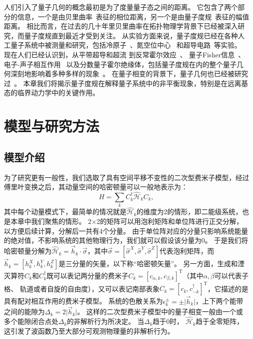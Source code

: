 		人们引入了量子几何的概念最初是为了度量量子态之间的距离。
		它包含了两个部分的信息，一个是由贝里曲率~\cite{Bohm2003}表征的相位距离，另一个是由量子度规~\cite{Provost1980,Matsuura2010,Ma2010b}表征的幅值距离。
		相比而言，在过去的几十年里贝里曲率在拓扑物理学背景下已经被深入研究，而量子度规直到最近才受到关注。
		从实验方面来说，量子度规已经在各种人工量子系统中被测量和研究，包括冷原子~\cite{Yi2023}、氮空位中心~\cite{Yu2019} 和超导电路~\cite{Zheng2022}等实验。
		现在人们已经认识到，从平带超导和超流\cite{Peotta2015,Julku2016,Peotta2023,Tian2023,Espinosa2024} 到反常霍尔效应~\cite{Gianfrate2020,Wang2021,Gao2023}、 量子Fisher信息~\cite{Braunstein1994,Zanardi2007,Hauke2016}、电子-声子相互作用~\cite{Yu2023} 以及分数量子霍尔绝缘体\cite{Parameswaran2013,Neupert2015,BMera2021,BMera20212}，包括量子度规在内的整个量子几何深刻地影响着多种多样的现象~\cite{Torma2023}。
		在量子相变的背景下，量子几何也已经被研究过~\cite{CAROLLO20201}。
		本章我们将揭示量子度规在解释量子系统中的非平衡现象，特别是在远离基态的临界动力学中的关键作用。

	\section{模型与研究方法}
	
		\subsection{模型介绍}
	
			为了研究更有一般性，我们选取了具有空间平移不变性的二次型费米子模型，经过傅里叶变换之后，其动量空间的哈密顿量可以一般地表示为：
			\begin{equation}
				H=\sum_k C^\dagger_k \hat{\mathcal{H}}_k C_k, \label{eq:Ham}
			\end{equation}
			其中每个动量模式下，最简单的情况就是$\hat{\mathcal{H}}_k$的维度为2的情形，即二能级系统，也是本章中我们聚焦的情形。
			2$\times$2的矩阵可以用泡利矩阵和单位阵进行正交分解，以方便后续计算，分解后一共有4个分量。
			由于单位阵对应的分量只影响系统能量的绝对值，不影响系统的其他物理行为，我们就可以假设该分量为0。
			于是我们将哈密顿量分解为$\hat{\mathcal{H}}_k = \vec{h}_k \cdot \vec{\sigma}$，其中$\vec{\sigma} = [\hat{\sigma}^X, \hat{\sigma}^Y, \hat{\sigma}^Z]$代表泡利矩阵，而$\vec{h}_k = [h_k^X, h_k^Y, h_k^Z]$是三分量的矢量，以下称“哈密顿矢量”。
			另一方面，生成和湮灭算符$C_k$和$C^\dagger_k$既可以表记两分量的费米子$C_k = [c_{\alpha, k}, c_{\beta, k}]^\text{T}$（其中$\alpha, \beta$可以代表子格、 轨道或者自旋的自由度），又可以表记南部表象$C_k = [c_k, c_{-k}^\dagger]^\text{T}$，它描述的是具有配对相互作用的费米子模型。
			系统的色散关系为$\epsilon_k^{\pm} = \pm \lvert \vec{h}_k \rvert$，上下两个能带之间的能隙为$\Delta_k = 2\lvert \vec{h}_k \rvert$。
			这样的二次型费米子模型中的量子相变一般由一个或多个能隙闭合点处$\Delta_k$的非解析行为所决定。
			当$\Delta_k$趋于0时， $\hat{\mathcal{H}}_k$趋于全零矩阵， 这引发了波函数乃至大部分可观测物理量的非解析行为。
			
